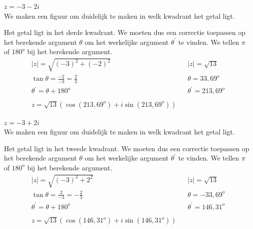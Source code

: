 \begin{voorbeeld}
	$z=-3-2i$ \\ We maken een figuur om duidelijk te maken in welk kwadrant het getal ligt. \\
	
	
	Het getal ligt in het derde kwadrant. We moeten dus een correctie toepassen op het berekende argument $\theta$ om het werkelijke argument $\theta^{'}$ te vinden. We tellen  $\pi$ of $180^{o}$ bij het berekende argument. \\
	\[ \begin{array}{lll}
	|z|=\sqrt{(-3)^2 +(-2)^2} & & |z|=\sqrt{13} \\
	\tan \theta = \frac{-2}{-3}=\frac{2}{3} & & \theta = 33,69^{o}\\
	\theta^{'}=\theta+180^{o} & & \theta^{'}=213,69^{o} \\
	&  &          \\
    z=\sqrt{13} (\cos (213,69^{o}) + i \sin (213,69^{o})) &  & 
	\end{array} \]
\end{voorbeeld}
	
\begin{voorbeeld}
	 $z=-3+2i$ \\ We maken een figuur om duidelijk te maken in welk kwadrant het getal ligt. \\

	
	Het getal ligt in het tweede kwadrant. We moeten dus een correctie toepassen op het berekende argument $\theta$ om het werkelijke argument $\theta^{'}$ te vinden. We tellen  $\pi$ of $180^{o}$ bij het berekende argument. \\
	\[ \begin{array}{lll}
	|z|=\sqrt{(-3)^2 +2^2} & & |z|=\sqrt{13} \\
	\tan \theta = \frac{2}{-3}=-\frac{2}{3} & & \theta = -33,69^{o}\\
	\theta^{'}=\theta+180^{o} & & \theta^{'}=146,31^{o} \\
	&  &          \\
	z=\sqrt{13} (\cos (146,31^{o}) + i \sin (146,31^{o})) &  & 
	\end{array} \]

\end{voorbeeld}

